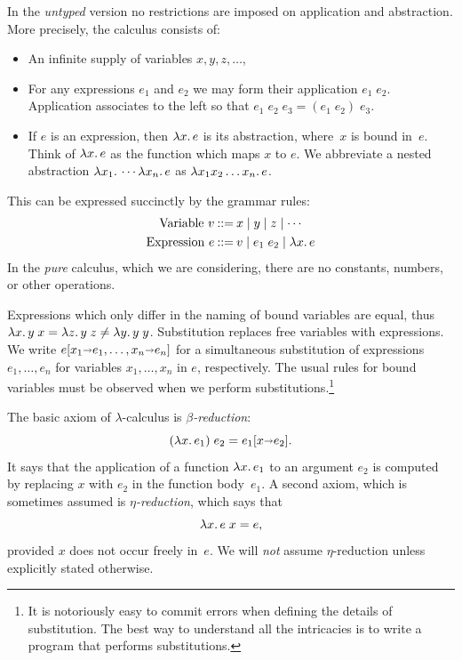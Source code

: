 In the \emph{untyped} version no restrictions are imposed on
application and abstraction. More precisely, the calculus consists of:
%
\begin{itemize}
\item An infinite supply of variables $x, y, z, \ldots$,
\item For any expressions $e_1$ and $e_2$ we may form their
  application $e_1\; e_2$. Application associates to the left so that
  $e_1\; e_2\; e_3 = (e_1\; e_2)\; e_3$.
\item If $e$ is an expression, then $\lambda x .\,e$ is its abstraction,
  where~$x$ is bound in~$e$. Think of $\lambda x .\,e$ as the function
  which maps $x$ to $e$. We abbreviate a nested abstraction
  $\lambda x_1 .\,\cdots \lambda x_n .\,e$ as $\lambda x_1 x_2 \ldots x_n .\,e$.
\end{itemize}
%
This can be expressed succinctly by the grammar rules:
%
\begin{align*}
  \text{Variable}\ v &\mathbin{{:}{:}{=}} x \mid y \mid z \mid \cdots \\
  \text{Expression}\ e &\mathbin{{:}{:}{=}} v \mid e_1\;e_2 \mid \lambda x .\,e
\end{align*}
%
In the \emph{pure} calculus, which we are considering, there are no
constants, numbers, or other operations.

Expressions which only differ in the naming of bound variables are
equal, thus $\lambda x .\,y\; x = \lambda z .\,y\; z \neq \lambda y .\,y\;
  y$. Substitution replaces free variables with expressions. We write
$e[x_1 {\shortrightarrow} e_1, \ldots, x_n {\shortrightarrow} e_n]$ for a
simultaneous substitution of expressions $e_1, \ldots, e_n$ for
variables $x_1, \ldots, x_n$ in $e$, respectively. The usual rules for
bound variables must be observed when we perform
substitutions.\footnote{It is notoriously easy to commit errors when
  defining the details of substitution. The best way to understand all
  the intricacies is to write a program that performs substitutions.}

The basic axiom of $\lambda$-calculus is \emph{$\beta$-reduction}:
%
\begin{equation*}
  (\lambda x .\,e_1)\; e_2 = e_1[x {\shortrightarrow} e_2].
\end{equation*}
%
It says that the application of a function $\lambda x .\,e_1$ to an
argument $e_2$ is computed by replacing $x$ with $e_2$ in the function
body~$e_1$. A second axiom, which is sometimes assumed is
\emph{$\eta$-reduction}, which says that
%
\begin{equation*}
  \lambda x .\,e\; x = e,
\end{equation*}
%
provided $x$ does not occur freely in~$e$. We will \emph{not} assume
$\eta$-reduction unless explicitly stated otherwise.

